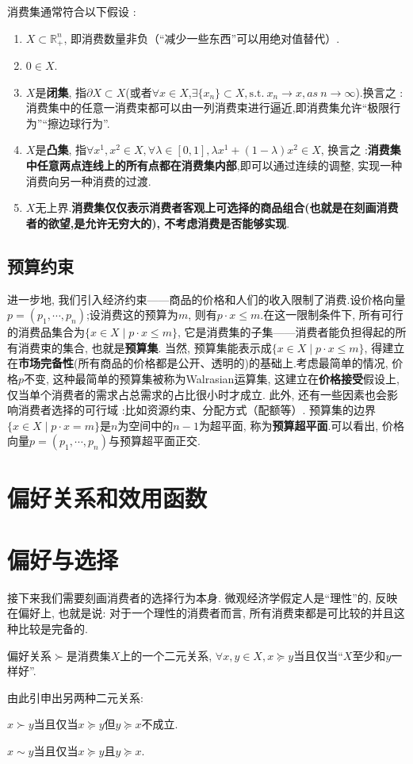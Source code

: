 \documentclass[lang=cn,10pt]{elegantbook}
\begin{document}
消费集通常符合以下假设 :
\begin{enumerate}
    \item $X\subset \mathbb{R}_{+}^{n}$, 即消费数量非负（“减少一些东西”可以用绝对值替代）.
    \item $0\in X$.
    \item $X$是\textbf{闭集}, 指$\partial X\subset X$(或者$\forall x\in X$,$\exists \{x_n\}\subset X,\mathrm{s.t.}\ x_n\to x,as\ n\to\infty$).换言之 :消费集中的任意一消费束都可以由一列消费束进行逼近,即消费集允许“极限行为”“擦边球行为”.
    \item $X$是\textbf{凸集}, 指$\forall x^1,x^2\in X,\forall \lambda\in [0,1],\lambda x^1+(1-\lambda)x^2\in X$, 换言之 :\textbf{消费集中任意两点连线上的所有点都在消费集内部},即可以通过连续的调整, 实现一种消费向另一种消费的过渡.
    \item $X$无上界.\textbf{消费集仅仅表示消费者客观上可选择的商品组合(也就是在刻画消费者的欲望,是允许无穷大的), 不考虑消费是否能够实现}.
\end{enumerate}
\subsection{预算约束}
进一步地, 我们引入经济约束——商品的价格和人们的收入限制了消费.设价格向量$p=(p_1,\cdots,p_n)$;设消费这的预算为$m$, 则有$p\cdot x\leq m$.在这一限制条件下, 所有可行的消费品集合为$\{x\in X\mid p\cdot x\leq m\}$, 它是消费集的子集——消费者能负担得起的所有消费束的集合, 也就是\textbf{预算集}.
当然, 预算集能表示成$\{x\in X\mid p\cdot x\leq m\}$, 得建立在\textbf{市场完备性}(所有商品的价格都是公开、透明的)的基础上.考虑最简单的情况, 价格$p$不变, 这种最简单的预算集被称为Walrasian运算集, 这建立在\textbf{价格接受}假设上, 仅当单个消费者的需求占总需求的占比很小时才成立.
此外, 还有一些因素也会影响消费者选择的可行域 :比如资源约束、分配方式（配额等）.
预算集的边界$\{x\in X\mid p\cdot x=m\}$是$n$为空间中的$n-1$为超平面, 称为\textbf{预算超平面}.可以看出, 价格向量$p=(p_1,\cdots,p_n)$与预算超平面正交.
\newpage
\section{偏好关系和效用函数}
\section{偏好与选择}
接下来我们需要刻画消费者的选择行为本身. 微观经济学假定人是“理性”的, 反映在偏好上, 也就是说: 对于一个理性的消费者而言, 所有消费束都是可比较的并且这种比较是完备的.
\begin{definition}
偏好关系$\succ$是消费集$X$上的一个二元关系, $\forall x,y\in X,x\succeq y$当且仅当“$X$至少和$y$一样好”.
\end{definition}
由此引申出另两种二元关系:
\begin{definition}[严格偏好关系]
    $x\succ y$当且仅当$x\succeq y$但$y\succeq x$不成立.
\end{definition}
\begin{definition}[无差异关系]
    $x\sim y$当且仅当$x\succeq y$且$y\succeq x$.
\end{definition}
\end{document}
